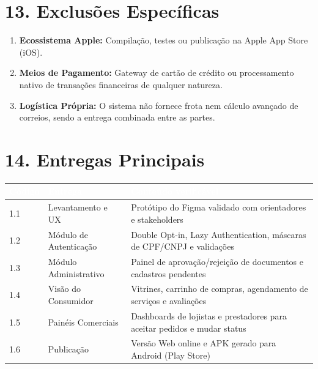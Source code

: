 \documentclass[11pt, a4paper]{article}
\begin{document}
\section*{\textcolor{headerblue}{13. Exclusões Específicas}}
\begin{enumerate}[label=\arabic*.]
    \item \textbf{Ecossistema Apple:} Compilação, testes ou publicação na Apple App Store (iOS).
    \item \textbf{Meios de Pagamento:} Gateway de cartão de crédito ou processamento nativo de transações financeiras de qualquer natureza.
    \item \textbf{Logística Própria:} O sistema não fornece frota nem cálculo avançado de correios, sendo a entrega combinada entre as partes.
\end{enumerate}

\section*{\textcolor{headerblue}{14. Entregas Principais}}
\begin{center}
\renewcommand{\arraystretch}{1.3}
\begin{tabularx}{\textwidth}{|l|l|X|}
\hline
\rowcolor{headerblue}
\textcolor{white}{\textbf{Código}} & \textcolor{white}{\textbf{Entrega}} & \textcolor{white}{\textbf{Conteúdo verificável}} \\
\hline
1.1 & Levantamento e UX & Protótipo do Figma validado com orientadores e stakeholders \\
\hline
1.2 & Módulo de Autenticação & Double Opt-in, Lazy Authentication, máscaras de CPF/CNPJ e validações \\
\hline
1.3 & Módulo Administrativo & Painel de aprovação/rejeição de documentos e cadastros pendentes \\
\hline
1.4 & Visão do Consumidor & Vitrines, carrinho de compras, agendamento de serviços e avaliações \\
\hline
1.5 & Painéis Comerciais & Dashboards de lojistas e prestadores para aceitar pedidos e mudar status \\
\hline
1.6 & Publicação & Versão Web online e APK gerado para Android (Play Store) \\
\hline
\end{tabularx}
\end{center}
\end{document}
